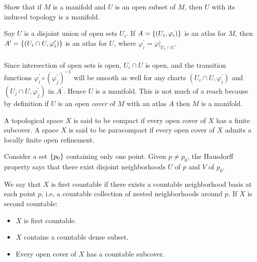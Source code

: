 \documentclass[10pt]{article}
\begin{document}
\begin{example}\label{b1e4}
	Show that if $M$ is a manifold and $U$ is an open subset of $M$, then $U$ with
	its induced topology is a manifold.
\end{example}
\sol Say $U$ is a disjoint union of open sets $U_i$. If $A=\lbrace(U_i,\varphi_i)\rbrace$ is an atlas for $M$, then $A^\prime=\lbrace(U_i \cap U,\varphi_i^\prime)\rbrace$ is an atlas for $U$, where $\varphi_i^\prime = \varphi|_{U_i \cap U}$.\\\\
Since intersection of open sets is open, $U_i \cap U$ is open, and the transition functions $\varphi_i^\prime \circ (\varphi_j^\prime)^{-1}$ will be smooth as well for any charts $(U_i \cap U,\varphi_i^\prime)$ and $(U_j \cap U,\varphi_j^\prime)$ in $A^\prime$. Hence $U$ is a manifold. This is not much of a reach because by definition if $U$ is an open \emph{cover} of $M$ with an atlas $A$ then $M$ is a manifold.


\begin{definition}
	 A topological space $X$ is said to be compact if every open cover of $X$ has a finite subcover. A space $X$ is said to be paracompact if every open cover of $X$ admits a locally finite open refinement.
\end{definition}


\begin{definition}
	 Consider a set $\lbrace p_0\rbrace$ containing only one point. Given $p \ne p_0$, the Hausdorff property says that there exist disjoint neighborhoods $U$ of $p$ and $V$ of $p_0$.
\end{definition}


\begin{definition}
	 We say that $X$ is first countable
	if there exists a countable neighborhood basis at each point $p$, i.e, a countable collection of nested neighborhoods around $p$. If $X$ is second countable:
	\begin{itemize}
		\item $X$ is first countable.
		\item $X$ contains a countable dense subset.
		\item Every open cover of $X$ has a countable subcover.
	\end{itemize}
\end{definition}
\end{document}
